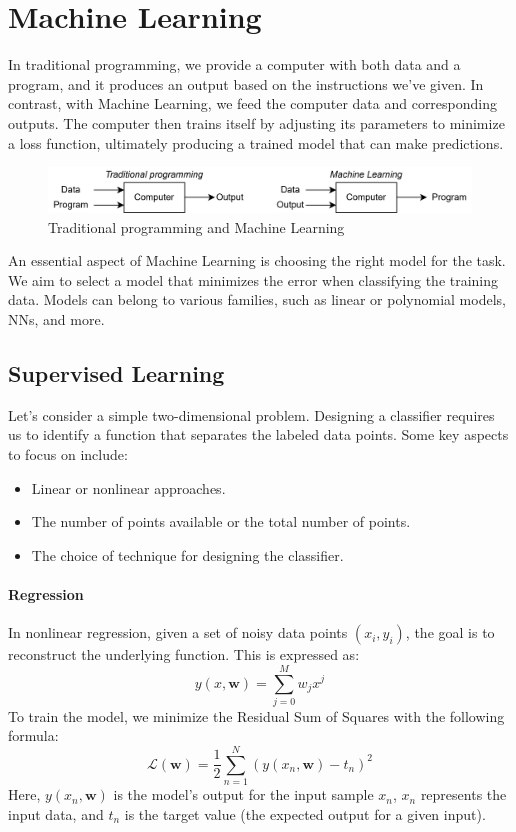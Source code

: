 \section{Machine Learning}

In traditional programming, we provide a computer with both data and a program, and it produces an output based on the instructions we've given. 
In contrast, with Machine Learning, we feed the computer data and corresponding outputs. 
The computer then trains itself by adjusting its parameters to minimize a loss function, ultimately producing a trained model that can make predictions.
\begin{figure}[H]
    \centering
    \includegraphics[width=1\linewidth]{images/eeai6.png}
    \caption{Traditional programming and Machine Learning}
\end{figure}
\noindent An essential aspect of Machine Learning is choosing the right model for the task. 
We aim to select a model that minimizes the error when classifying the training data. 
Models can belong to various families, such as linear or polynomial models, NNs, and more.

\subsection{Supervised Learning}
Let's consider a simple two-dimensional problem. 
Designing a classifier requires us to identify a function that separates the labeled data points. 
Some key aspects to focus on include:
\begin{itemize}
    \item Linear or nonlinear approaches. 
    \item The number of points available or the total number of points. 
    \item The choice of technique for designing the classifier.
\end{itemize}

\paragraph*{Regression}
In nonlinear regression, given a set of noisy data points $(x_i,y_i)$, the goal is to reconstruct the underlying function. 
This is expressed as:
\[y(x,\mathbf{w})=\sum_{j=0}^{M}w_jx^j\]
\noindent To train the model, we minimize the Residual Sum of Squares with the following formula:
\[\mathcal{L}(\mathbf{w})=\dfrac{1}{2}\sum_{n=1}^N\left(y(x_n,\mathbf{w})-t_n\right)^2\]
Here, $y(x_n,\mathbf{w})$  is the model's output for the input sample $x_n$, $x_n$ represents the input data, and $t_n$ is the target value (the expected output for a given input).

